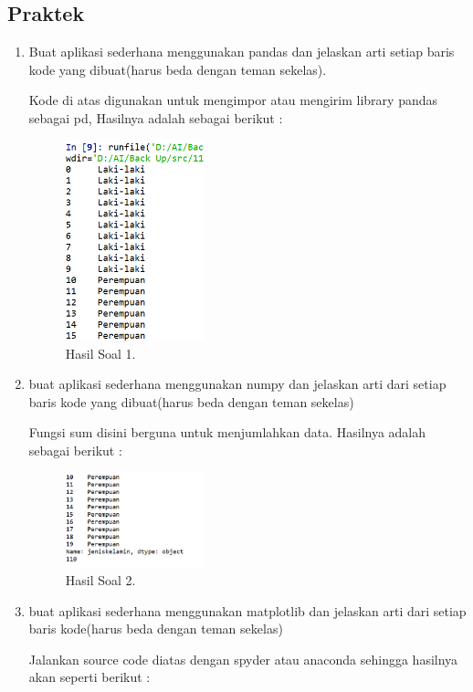 \subsection{Praktek}
\begin{enumerate}
	\item Buat aplikasi sederhana menggunakan pandas dan jelaskan arti setiap baris kode yang dibuat(harus beda dengan teman sekelas).
	\hfill\break
	
	Kode di atas digunakan untuk mengimpor atau mengirim library pandas sebagai pd, Hasilnya adalah sebagai berikut :
	\begin{figure}[H]
	\centering
		\includegraphics[width=4cm]{figures/1164013/3/hsl1.png}
		\caption{Hasil Soal 1.}
	\end{figure}
	\item buat aplikasi sederhana menggunakan numpy dan jelaskan arti dari setiap baris kode yang dibuat(harus beda dengan teman sekelas)
	\hfill\break
	
	Fungsi sum disini berguna untuk menjumlahkan data. Hasilnya adalah sebagai berikut :
	\begin{figure}[H]
	\centering
		\includegraphics[width=4cm]{figures/1164013/3/hsl2.png}
		\caption{Hasil Soal 2.}
	\end{figure}
	\item buat aplikasi sederhana menggunakan matplotlib dan jelaskan arti dari setiap baris kode(harus beda dengan teman sekelas)
	\hfill\break
	
	Jalankan source code diatas dengan spyder atau anaconda sehingga hasilnya akan seperti berikut : 

\end{enumerate}
